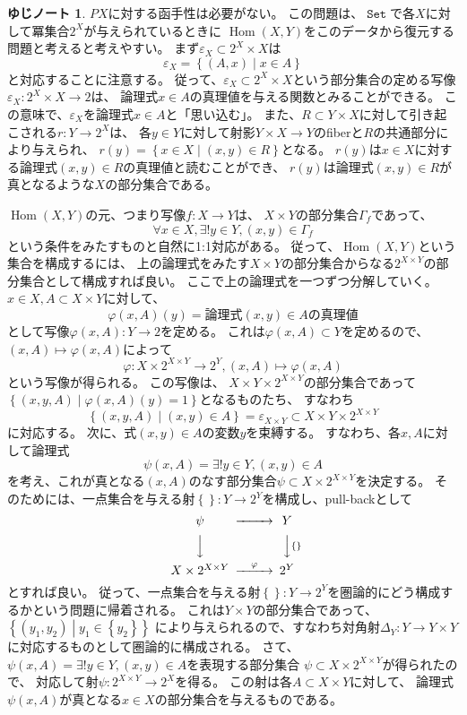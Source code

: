 \documentclass[uplatex]{jsarticle}
\theoremstyle{definition}
\newtheorem*{rrem*}{ゆじノート}
\def\ep{\varepsilon}
\DeclareMathOperator{\Hom}{Hom}
\DeclareMathOperator{\sfSet}{\mathtt{Set}}
\begin{document}
\begin{rrem*}
  \(PX\)に対する函手性は必要がない。
  この問題は、\(\sfSet\)で各\(X\)に対して冪集合\(2^X\)が与えられているときに
  \(\Hom(X,Y)\)をこのデータから復元する問題と考えると考えやすい。
  まず\(\ep_X\subset 2^X\times X\)は
  \[
  \ep_X = \left\{ (A,x) \middle| x\in A\right\}
  \]
  と対応することに注意する。
  従って、\(\ep_X\subset 2^X\times X\)という部分集合の定める写像
  \(\ep_X:2^X\times X\to 2\)は、
  論理式\(x\in A\)の真理値を与える関数とみることができる。
  この意味で、\(\ep_X\)を論理式\(x\in A\)と「思い込む」。
  また、\(R\subset Y\times X\)に対して引き起こされる\(r:Y\to 2^X\)は、
  各\(y\in Y\)に対して射影\(Y\times X\to Y\)のfiberと\(R\)の共通部分により与えられ、
  \(r(y) = \left\{ x\in X\middle| (x,y)\in R\right\}\)となる。
  \(r(y)\)は\(x\in X\)に対する論理式\((x,y)\in R\)の真理値と読むことができ、
  \(r(y)\)は論理式\((x,y)\in R\)が真となるような\(X\)の部分集合である。

  \(\Hom(X,Y)\)の元、つまり写像\(f:X\to Y\)は、
  \(X\times Y\)の部分集合\(\Gamma_f\)であって、
  \[
  \forall x\in X, \exists! y\in Y, (x,y)\in \Gamma_f
  \]
  という条件をみたすものと自然に1:1対応がある。
  従って、\(\Hom(X,Y)\)という集合を構成するには、
  上の論理式をみたす\(X\times Y\)の部分集合からなる\(2^{X\times Y}\)の部分集合として構成すれば良い。
  ここで上の論理式を一つずつ分解していく。
  \(x\in X,A\subset X\times Y\)に対して、
  \[
  \varphi(x,A)(y) = \text{論理式\((x,y)\in A\)の真理値}
  \]
  として写像\(\varphi(x,A):Y\to 2\)を定める。
  これは\(\varphi(x,A)\subset Y\)を定めるので、
  \((x,A)\mapsto \varphi(x,A)\)によって
  \[
  \varphi: X\times 2^{X\times Y} \to 2^Y , (x,A) \mapsto \varphi(x,A)
  \]
  という写像が得られる。
  この写像は、
  \(X\times Y \times 2^{X\times Y}\)の部分集合であって
  \(\left\{ (x,y,A) \middle| \varphi(x,A)(y) = 1\right\}\)となるものたち、
  すなわち
  \[
  \left\{ (x,y,A) \middle| (x,y)\in A\right\} = \ep_{X\times Y}
  \subset X\times Y \times 2^{X\times Y}
  \]
  に対応する。
  次に、式\((x,y)\in A\)の変数\(y\)を束縛する。
  すなわち、各\(x,A\)に対して論理式
  \[
  \psi(x,A) = \exists! y\in Y, (x,y)\in A
  \]
  を考え、これが真となる\((x,A)\)のなす部分集合\(\psi\subset X\times 2^{X\times Y}\)を決定する。
  そのためには、一点集合を与える射\(\left\{ \right\} : Y\to 2^Y\)を構成し、pull-backとして
  \[
  \begin{CD}
    \psi @>>> Y \\
    @VVV @VV\left\{ \right\} V \\
    X\times 2^{X\times Y} @>\varphi>> 2^Y
  \end{CD}
  \]
  とすれば良い。
  従って、一点集合を与える射\(\left\{\right\}:Y\to 2^Y\)を圏論的にどう構成するかという問題に帰着される。
  これは\(Y\times Y\)の部分集合であって、
  \(\left\{ (y_1,y_2) \middle| y_1 \in \left\{ y_2\right\} \right\}\)
  により与えられるので、すなわち対角射\(\Delta_Y:Y\to Y\times Y\)に対応するものとして圏論的に構成される。
  さて、\(\psi(x,A) = \exists! y\in Y, (x,y)\in A\)を表現する部分集合
  \(\psi \subset X\times 2^{X\times Y}\)が得られたので、
  対応して射\(\psi :2^{X\times Y} \to 2^X\)を得る。
  この射は各\(A\subset X\times Y\)に対して、
  論理式\(\psi(x,A)\)が真となる\(x\in X\)の部分集合を与えるものである。


\end{rrem*}
\end{document}
